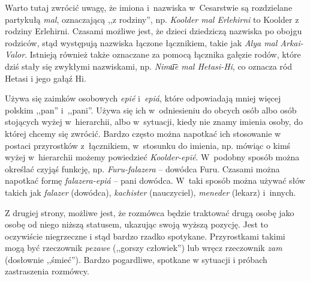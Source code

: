 
Warto tutaj zwrócić uwagę, że imiona i~nazwiska w~Cesarstwie są rozdzielane
partykułą \emph{mal}, oznaczającą ,,z rodziny'', np. \emph{Koolder mal
    Erlehirni} to Koolder z rodziny Erlehirni. Czasami możliwe jest, że dzieci
dziedziczą nazwiska po obojgu rodziców, stąd występują nazwiska łączone
łącznikiem, takie jak \emph{Alya mal Arkai-Valor}. Istnieją również także
oznaczane za pomocą łącznika gałęzie rodów, które dziś stały się zwykłymi
nazwiskami, np. \emph{Nimu͞e mal Hetasi-Hi}, co oznacza ród Hetasi i jego gałąź
Hi.

\skipline

Używa się zaimków osobowych \emph{epié} i~\emph{epiá}, które odpowiadają mniej
więcej polskim ,,pan'' i~,,pani''. Używa się ich w~odniesieniu do obcych osób
albo osób stojących wyżej w~hierarchii, albo w~sytuacji, kiedy nie znamy imienia
osoby, do której chcemy się zwrócić. Bardzo często można napotkać ich stosowanie
w postaci przyrostków z~łącznikiem, w~stosunku do imienia, np. mówiąc o kimś
wyżej w~hierarchii możemy powiedzieć \emph{Koolder-epié}. W~podobny sposób
można określać czyjąś funkcję, np. \emph{Furu-falazera} -- dowódca Furu. Czasami
można napotkać formę \emph{falazera-epiá} -- pani dowódca. W~taki sposób można
używać słów takich jak \emph{falazer} (dowódca), \emph{kachister} (nauczyciel),
\emph{meneder} (lekarz) i~innych.


\skipline

Z drugiej strony, możliwe jest, że rozmówca będzie traktować drugą osobę jako
osobę od niego niższą statusem, ukazując swoją wyższą pozycję. Jest to
oczywiście niegrzeczne i stąd bardzo rzadko spotykane. Przyrostkami takimi mogą
być rzeczownik \emph{pezawe} (,,gorszy człowiek'') lub wręcz rzeczownik
\emph{zam} (dosłownie ,,śmieć''). Bardzo pogardliwe, spotkane w sytuacji i
próbach zastraszenia rozmówcy.

